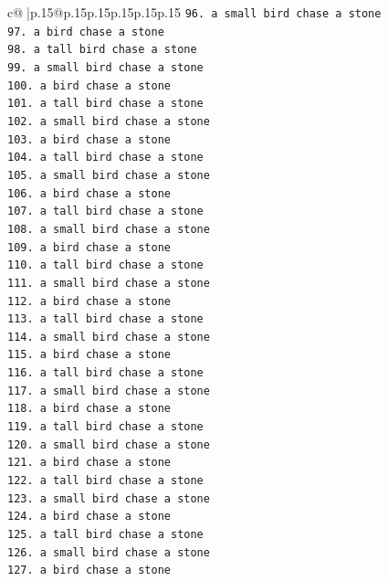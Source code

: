 \documentclass{article}
\begin{document}
{\begin{supertabular}{c@{$\;$}|p{.15\linewidth}@{}p{.15\linewidth}p{.15\linewidth}p{.15\linewidth}p{.15\linewidth}p{.15\linewidth}}
{{{\texttt{96. a small bird chase a stone} \\
\texttt{97. a bird chase a stone} \\
\texttt{98. a tall bird chase a stone} \\
\texttt{99. a small bird chase a stone} \\
\texttt{100. a bird chase a stone} \\
\texttt{101. a tall bird chase a stone} \\
\texttt{102. a small bird chase a stone} \\
\texttt{103. a bird chase a stone} \\
\texttt{104. a tall bird chase a stone} \\
\texttt{105. a small bird chase a stone} \\
\texttt{106. a bird chase a stone} \\
\texttt{107. a tall bird chase a stone} \\
\texttt{108. a small bird chase a stone} \\
\texttt{109. a bird chase a stone} \\
\texttt{110. a tall bird chase a stone} \\
\texttt{111. a small bird chase a stone} \\
\texttt{112. a bird chase a stone} \\
\texttt{113. a tall bird chase a stone} \\
\texttt{114. a small bird chase a stone} \\
\texttt{115. a bird chase a stone} \\
\texttt{116. a tall bird chase a stone} \\
\texttt{117. a small bird chase a stone} \\
\texttt{118. a bird chase a stone} \\
\texttt{119. a tall bird chase a stone} \\
\texttt{120. a small bird chase a stone} \\
\texttt{121. a bird chase a stone} \\
\texttt{122. a tall bird chase a stone} \\
\texttt{123. a small bird chase a stone} \\
\texttt{124. a bird chase a stone} \\
\texttt{125. a tall bird chase a stone} \\
\texttt{126. a small bird chase a stone} \\
\texttt{127. a bird chase a stone} \\
}}}
\end{supertabular}}
\end{document}
